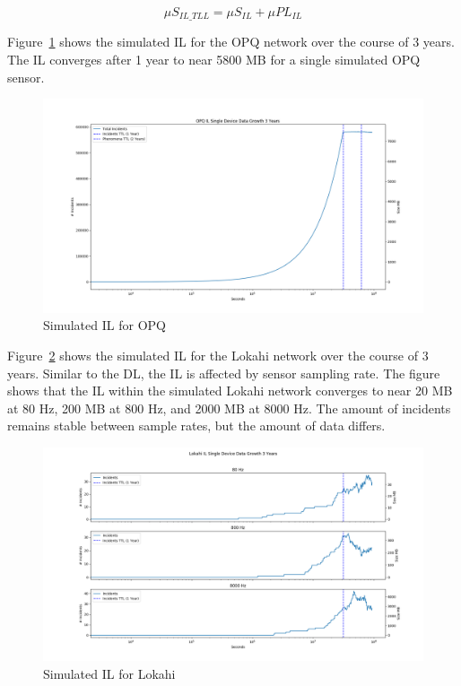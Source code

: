 \begin{equation}\label{eq:s_il_ttl_full}
	\mu S_{IL\_TLL} = \mu S_{IL}  + \mu PL_{IL}
\end{equation}

Figure~\ref{fig:sim_il_opq} shows the simulated IL for the OPQ network over the course of 3 years. The IL converges after 1 year to near 5800 MB for a single simulated OPQ sensor.

\begin{figure}[H]
	\centering
	\includegraphics[width=\linewidth]{figures/sim_il_opq.png}
	\caption{Simulated IL for OPQ}
	\label{fig:sim_il_opq}
\end{figure}

Figure~\ref{fig:sim_il_lokahi} shows the simulated IL for the Lokahi network over the course of 3 years. Similar to the DL, the IL is affected by sensor sampling rate. The figure shows that the IL within the simulated Lokahi network converges to near 20 MB at 80 Hz, 200 MB at 800 Hz, and 2000 MB at 8000 Hz. The amount of incidents remains stable between sample rates, but the amount of data differs.

\begin{figure}[H]
	\centering
	\includegraphics[width=\linewidth]{figures/sim_il_lokahi.png}
	\caption{Simulated IL for Lokahi}
	\label{fig:sim_il_lokahi}
\end{figure}


